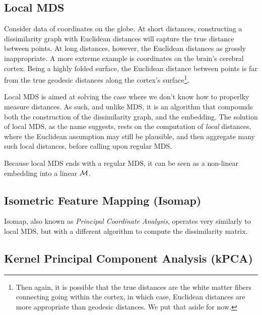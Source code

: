 \documentclass[12pt,a4paper]{article}
\begin{document}
\subsection{Local MDS}
\label{sec:localMDS}

\begin{example}
\label{ex:non-euclidean}
	Consider data of coordinates on the globe. 
	At short distances, constructing a dissimilarity graph with Euclidean distances will capture the true distance between points. 
	At long distances, however, the Euclidean distances as grossly inappropriate. 
	A more extreme example is coordinates on the brain's cerebral cortex.
	Being a highly folded surface, the Euclidean distance between points is far from the true geodesic distances along the cortex's surface\footnote{Then again, it is possible that the true distances are the white matter fibers connecting going within the cortex, in which case, Euclidean distances are more appropriate than geodesic distances. We put that aside for now.}.
\end{example}

Local MDS is aimed at solving the case where we don't know how to properlky measure distances. 
As such, and unlike MDS, it is an algorithm that compounds both the construction of the dissimilarity graph, and the embedding. 
The solution of local MDS, as the name suggests, rests on the computation of \emph{local} distances, where the Euclidean assumption may still be plausible, and then aggregate many such local distances, before calling upon regular MDS.

Because local MDS ends with a regular MDS, it can be seen as a non-linear embedding into a linear $\mathcal{M}$.





\subsection{Isometric Feature Mapping (Isomap)}
\label{sec:isomap}

Isomap, also known as \emph{Principal Coordinate Analysis}, operates very similarly to local MDS, but with a different algorithm to compute the dissimilarity matrix.



\subsection{Kernel Principal Component Analysis (kPCA)}
\label{sec:kpca}
\end{document}
